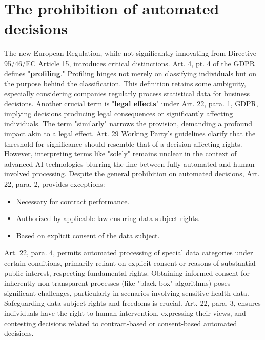 \section{The prohibition of automated decisions}
The new European Regulation, while not significantly innovating from Directive 95/46/EC Article 15, introduces critical distinctions. Art. 4, pt. 4 of the GDPR defines "\textbf{profiling}." Profiling hinges not merely on classifying individuals but on the purpose behind the classification. This definition retains some ambiguity, especially considering companies regularly process statistical data for business decisions.
\newline
Another crucial term is "\textbf{legal effects}" under Art. 22, para. 1, GDPR, implying decisions producing legal consequences or significantly affecting individuals. The term "similarly" narrows the provision, demanding a profound impact akin to a legal effect. Art. 29 Working Party’s guidelines clarify that the threshold for significance should resemble that of a decision affecting rights.
\newline
However, interpreting terms like "solely" remains unclear in the context of advanced AI technologies blurring the line between fully automated and human-involved processing.
\newline
Despite the general prohibition on automated decisions, Art. 22, para. 2, provides exceptions:

\begin{itemize}
    \item Necessary for contract performance.
    \item Authorized by applicable law ensuring data subject rights.
    \item Based on explicit consent of the data subject.
\end{itemize}

Art. 22, para. 4, permits automated processing of special data categories under certain conditions, primarily reliant on explicit consent or reasons of substantial public interest, respecting fundamental rights.
\newline
Obtaining informed consent for inherently non-transparent processes (like "black-box" algorithms) poses significant challenges, particularly in scenarios involving sensitive health data.
\newline
Safeguarding data subject rights and freedoms is crucial. Art. 22, para. 3, ensures individuals have the right to human intervention, expressing their views, and contesting decisions related to contract-based or consent-based automated decisions.

